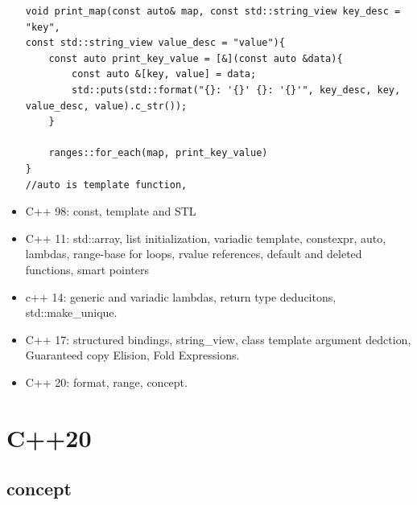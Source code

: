 \documentclass[a4paper,11pt,twoside]{book}
\begin{document}
\begin{itemize}
\begin{lstlisting}
void print_map(const auto& map, const std::string_view key_desc = "key",
const std::string_view value_desc = "value"){
	const auto print_key_value = [&](const auto &data){
		const auto &[key, value] = data;
		std::puts(std::format("{}: '{}' {}: '{}'", key_desc, key, value_desc, value).c_str());
	}
	
	ranges::for_each(map, print_key_value)		   
}	
//auto is template function, 
\end{lstlisting}	
\item C++ 98: const, template and STL
\item C++ 11: std::array, list initialization, variadic template, constexpr, auto, lambdas, range-base for loops, rvalue references, default and deleted functions, smart pointers
\item c++ 14: generic and variadic lambdas, return type deducitons, std::make\_unique.
\item C++ 17: structured bindings, string\_view, class template argument dedction, Guaranteed copy Elision, Fold Expressions.
\item C++ 20: format, range, concept. 

\end{itemize}

\section{C++20}

\subsection{concept}
\end{document}

